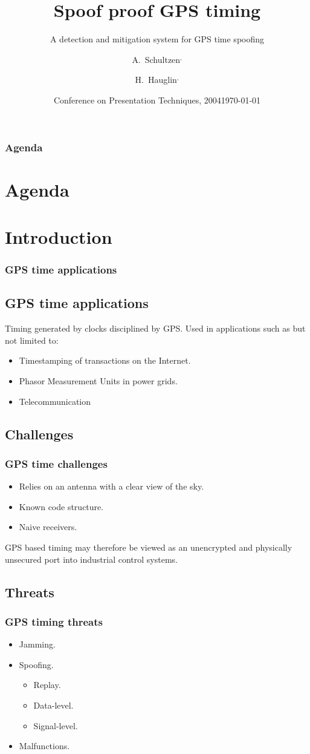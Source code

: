 \documentclass[xcolor=table]{beamer}
\title[Spoof proof GPS timing] %
{Spoof proof GPS timing}
\subtitle{A detection and mitigation system for GPS time spoofing}
\author[A. Schultzen, H. Hauglin] %
{A.~Schultzen\inst{1}$^{,}$\inst{2} \and H.~Hauglin\inst{1}$^{,}$\inst{3}}
\institute[Universities Here and There] %
{
  \inst{1}%
  Department of Informatics\\
  University of Oslo
  \and
  \inst{2}%
  Norwegian Metrology Service\\
  Justervesenet
  \and
  \inst{3}
  UNIK\\
  University Graduate Center
}
\date[KPT 2004] %
{Conference on Presentation Techniques, 2004}
\date{\today}
\begin{document}
\frame{\titlepage}
\begin{frame}
\frametitle{Agenda}
\section *{Agenda}
\tableofcontents
\end{frame}

\section{Introduction}
\begin{frame}
\frametitle{GPS time applications}
	\subsection{GPS time applications}
  Timing generated by clocks disciplined by GPS. Used in applications such as but not limited to:
  \begin{itemize}
    \item Timestamping of transactions on the Internet.
    \item Phasor Measurement Units in power grids.
    \item Telecommunication
  \end{itemize}
\end{frame}

\subsection{Challenges}
\begin{frame}
\frametitle{GPS time challenges}
  \begin{itemize}
    \item Relies on an antenna with a clear view of the sky.
    \item Known code structure.
    \item Naive receivers.
  \end{itemize}
  GPS based timing may therefore be viewed as an unencrypted and physically unsecured port into industrial control systems. 
\end{frame}

\subsection{Threats}
\begin{frame}
\frametitle{GPS timing threats}
\begin{itemize}
  \item Jamming.
  \item Spoofing.
  \begin{itemize}
    \item Replay.
    \item Data-level.
    \item Signal-level.
  \end{itemize}
  \item Malfunctions.
\end{itemize}    
\end{frame}
\end{document}
